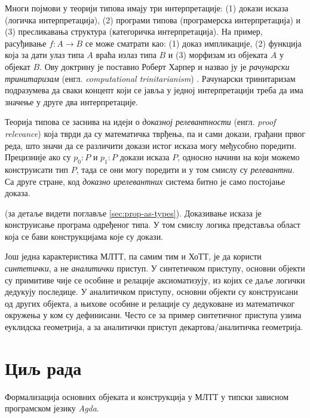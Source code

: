 \documentclass[12pt,oneside]{memoir}
\begin{document}
Многи појмови у теорији типова имају три интерпретације: (1) докази исказа (логичка интерпретација), (2) програми типова (програмерска интерпретација) и (3) пресликавања структура (категоричка интерпретација). На пример, расуђивање $f : A \to B$ се може сматрати као: (1) доказ импликације, (2) функција која за дати улаз типа $A$ враћа излаз типа $B$ и (3) морфизам из објеката $A$ у објекат $B$. Ову доктрину је поставио Роберт Харпер и назвао ју је \emph{рачунарски тринитаризам} (енгл. \emph{computational trinitarianism}) \cite{rob11}. Рачунарски тринитаризам подразумева да сваки концепт који се јавља у једној интерпретацији треба да има значење у друге два интерпретације.  

Теорија типова се заснива на идеји о \emph{доказној релевантности} (енгл. \emph{proof relevance}) која тврди да су математичка тврђења, па и сами докази, грађани првог реда, што значи да се различити докази истог исказа могу међусобно поредити. Прецизније ако су $p_0 : P$ и $p_1 : P$ докази исказа $P$, односно начини на који можемо конструисати тип $P$, тада се они могу поредити и у том смислу су \emph{релевантни}. Са друге стране, код \emph{доказно ирелевантних} система битно је само постојање доказа. 

(за детаље видети поглавље \ref{sec:prop-as-types}). Доказивање исказа је конструисање програма одређеног типа. У том смислу логика представља област која се бави конструкцијама које су докази.

Још једна карактеристика МЛТТ, па самим тим и ХоТТ, је да користи \emph{синтетички}, а не \emph{аналитички} приступ. У синтетичком приступу, основни објекти су примитиве чије се особине и релације аксиоматизују, из којих се даље логички дедукују последице. У аналитичком приступу, основни објекти су конструисани од других објекта, а њихове особине и релације су дедуковане из математичког окружења у ком су дефинисани. Често се за пример синтетичног приступа узима еуклидска геометрија, а за аналитички приступ декартова/аналитичка геометрија.

\section{Циљ рада}

Формализација основних објеката и конструкција у МЛТТ у типски зависном програмском језику \emph{Agda}.
\end{document}

